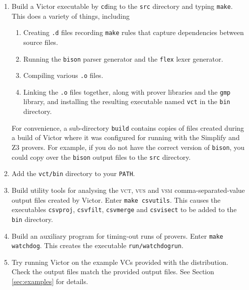 \documentclass[12pt,fleqn]{article}
\newcommand{\zthree}{\textsc{Z}3}
\newcommand{\goalreportfile}{\textsc{vct}}
\newcommand{\unitsumfile}{\textsc{vus}}
\newcommand{\sessionsumfile}{\textsc{vsm}}
\begin{document}
\begin{enumerate}
\item Build a Victor executable by \texttt{cd}ing to the \texttt{src}
  directory and typing \texttt{make}.  This does a variety of things, including
  \begin{enumerate}
  \item Creating \texttt{.d} files recording \texttt{make} rules that
     capture dependencies between source files.
   \item Running the \texttt{bison} parser generator and the \texttt{flex}
     lexer generator.
   \item Compiling various \texttt{.o} files.
   \item Linking the \texttt{.o} files together, along with prover
     libraries and the \texttt{gmp} library, and installing the
     resulting executable named \texttt{vct} in the \texttt{bin}
     directory.
  \end{enumerate}
  For convenience, a sub-directory \texttt{build} contains copies
  of files created during a build of Victor where it was configured
  for running with the Simplify and \zthree{} provers.  For example, if you
  do not have the correct version of \texttt{bison}, you could copy over
  the \texttt{bison} output files to the \texttt{src} directory.


\item Add the \texttt{vct/bin} directory to your \texttt{PATH}.


\item Build utility tools for analysing the \goalreportfile{},
  \unitsumfile{} and \sessionsumfile{} comma-separated-value output
  files created by Victor.  Enter \texttt{make csvutils}.  This causes
  the executables \texttt{csvproj}, \texttt{csvfilt},
  \texttt{csvmerge} and \texttt{csvisect} to be added to the
  \texttt{bin} directory.

\item Build an auxiliary program for timing-out runs of provers.
  Enter \texttt{make watchdog}.  This creates the executable
  \texttt{run/watchdogrun}.

\item Try running Victor on the example VCs provided with the distribution.
  Check the output files match the provided output files.  See Section
  \ref{sec:examples}
  for details.
\end{enumerate}

\end{document}
